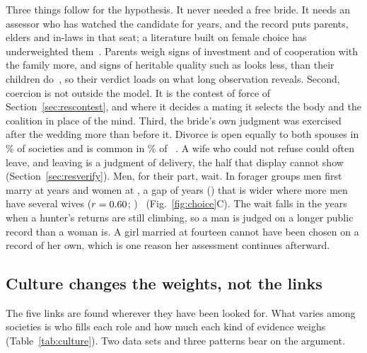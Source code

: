 Three things follow for the hypothesis. It never needed a free bride. It needs an assessor who has watched the candidate
for years, and the record puts parents, elders and in-laws in that seat; a literature built on female choice has
underweighted them~\cite{apostolou2007,apostolou2010}. Parents weigh signs of investment and of cooperation with the family more, and signs of heritable quality such as looks
less, than their children do~\cite{buunk2008}, so their verdict loads on what long observation reveals. Second, coercion
is not outside the model. It is the contest of force of Section~\ref{sec:rescontest}, and where it decides a mating it
selects the body and the coalition in place of the mind. Third, the bride's own judgment was exercised after the wedding
more than before it. Divorce is open equally to both spouses in \CcDivEqPct\% of \CcDivN{} societies and is common in
\CcDivCommonPct\% of \CcDivFreqN~\cite{whyte1978,broude1983}. A wife who could not refuse could often leave, and leaving is
a judgment of delivery, the half that display cannot show (Section~\ref{sec:resverify}). Men, for their part, wait. In
\CcAgeN{} forager groups men first marry at \CcAgeM{} years and women at \CcAgeW, a gap of \CcGap{} years (\CcGapCI) that
is wider where more men have several wives ($r=0.60$; \CcGapPolyCI)~\cite{binford2001} (Fig.~\ref{fig:choice}C).
The wait falls in the years when a hunter's returns are still climbing, so a man is judged on a longer public record than
a woman is. A girl married at fourteen cannot have been chosen on a record of her own, which is one reason her assessment
continues afterward.

\subsection{Culture changes the weights, not the links}\label{sec:resculture}

The five links are found wherever they have been looked for. What varies among societies is who fills each role and how
much each kind of evidence weighs (Table~\ref{tab:culture}). Two data sets and three patterns bear on the argument.

